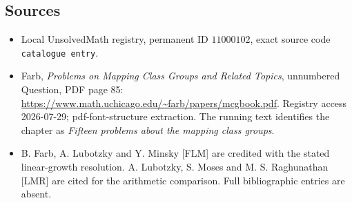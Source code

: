 \documentclass[11pt]{article}
\begin{document}
\subsection{Sources}
\begin{itemize}
\item Local UnsolvedMath registry, permanent ID \(11000102\), exact source code \texttt{catalogue entry}.
\item Farb, \emph{Problems on Mapping Class Groups and Related Topics}, unnumbered Question, PDF page 85: \url{https://www.math.uchicago.edu/~farb/papers/mcgbook.pdf}. Registry access 2026-07-29; pdf-font-structure extraction. The running text identifies the chapter as \emph{Fifteen problems about the mapping class groups}.
\item B. Farb, A. Lubotzky and Y. Minsky [FLM] are credited with the stated linear-growth resolution. A. Lubotzky, S. Moses and M. S. Raghunathan [LMR] are cited for the arithmetic comparison. Full bibliographic entries are absent.
\end{itemize}
\end{document}
